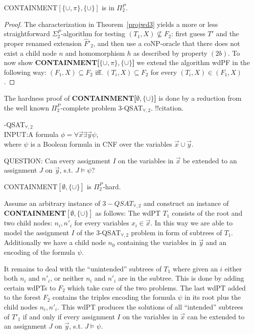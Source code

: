 \begin{theorem}
	CONTAINMENT$[\{\cup,\pi\},\{\cup\}]$ is in $\Pi^P_2$.
\end{theorem}
\begin{proof}
	The characterization in Theorem~\ref{projwd3} yields a more or less
	straightforward $\Sigma^P_2$-algorithm for testing $(T_1,X) \not\subseteq
	F_2$: first guess $T'$ and the proper renamed extension $\hat{F}'_2$, and
	then use a coNP-oracle that there does not exist a child node $n$ and
	homomorphism $h$ as described by property $(2b)$.
	To now show \textbf{CONTAINMENT[$\{\cup,\pi\},\{\cup\}$]} we extend the algorithm
	wdPF in the following way: $(F_1,X) \subseteq F_2$ iff. $(T_i,X) \subseteq
	F_2$ for every $(T_i,X) \in (F_1,X)$.
\end{proof}

The hardness proof of \textbf{CONTAINMENT[$\emptyset,\{\cup\}$]} is done by a reduction from
the well known $\Pi^P_2$-complete problem 3-QSAT$_{\forall,2}$. !!citation.

\begin{framed}-QSAT$_{\forall,2}$\\
	INPUT:A formula $\phi= \forall \vec{x}\exists \vec{y} \psi$,\\
	where $\psi$ is a Boolean formula in CNF over the variables
	$\vec{x}\cup\vec{y}$.
	
	QUESTION: Can every assignment $I$ on the variables in $\vec{x}$ be extended
	to an assignment $J$ on $\vec{y}$, s.t. $J \models \psi$?
\end{framed}


\begin{theorem}\label{cemptycup}
	CONTAINMENT$[\emptyset,\{\cup\}]$ is $\Pi^P_2$-hard.
\end{theorem}
\begin{proofidea}
	Assume an arbitrary instance of $3-QSAT_{\forall,2}$ and construct an
	instance of \textbf{CONTAINMENT$[\emptyset,\{\cup\}]$} as follows: The wdPT $T_1$
	consists of the root and two child nodes: $n_i, n'_i$ for every variables
	$x_i \in \vec{x}$. In this way we are able to model the assignment $I$ of
	the 3-QSAT$_{\forall,2}$ problem in form of subtrees of $T_1$. 
	Additionally we have a child node $n_0$ containing the
	variables in $\vec{y}$ and an encoding of the formula $\psi$. 
	
	It remains to deal with the ``unintended'' subtrees of $T_1$ where given an
	$i$ either both $n_i$ and $n'_i$, or neither $n_i$ and $n'_i$ are in the subtree.
	This is done by adding certain wdPTs to $F_2$ which take care of the two
	problems. The last wdPT added to the forest $F_2$ contains the triples
	encoding the formula $\psi$ in its root plus the child nodes $n_i,n'_i$.
	This wdPT produces the solutions of all ``intended'' subtrees of $T'_1$ if
	and only if every assignment $I$ on the variables in $\vec{x}$ can be
	extended to an assignment $J$ on $\vec{y}$, s.t. $J \models \psi$.
\end{proofidea}

